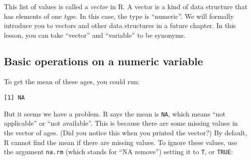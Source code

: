 \documentclass[
  letterpaper,
  DIV=11,
  numbers=noendperiod]{scrreprt}
\newenvironment{Shaded}{\begin{snugshade}}{\end{snugshade}}
\newcommand{\AttributeTok}[1]{\textcolor[rgb]{0.40,0.45,0.13}{#1}}
\newcommand{\FunctionTok}[1]{\textcolor[rgb]{0.28,0.35,0.67}{#1}}
\newcommand{\NormalTok}[1]{\textcolor[rgb]{0.00,0.23,0.31}{#1}}
\newcommand{\SpecialCharTok}[1]{\textcolor[rgb]{0.37,0.37,0.37}{#1}}
\begin{document}
\begin{tcolorbox}[enhanced jigsaw, colframe=quarto-callout-note-color-frame, rightrule=.15mm, opacityback=0, breakable, coltitle=black, colbacktitle=quarto-callout-note-color!10!white, bottomrule=.15mm, leftrule=.75mm, toprule=.15mm, arc=.35mm, bottomtitle=1mm, colback=white, left=2mm, opacitybacktitle=0.6, titlerule=0mm, title=\textcolor{quarto-callout-note-color}{\faInfo}\hspace{0.5em}{Vocab}, toptitle=1mm]

This list of values is called a \emph{vector} in R. A vector is a kind
of data structure that has elements of one \emph{type}. In this case,
the type is ``numeric''. We will formally introduce you to vectors and
other data structures in a future chapter. In this lesson, you can take
``vector'' and ``variable'' to be synonyms.

\end{tcolorbox}

\hypertarget{basic-operations-on-a-numeric-variable}{%
\subsection{Basic operations on a numeric
variable}\label{basic-operations-on-a-numeric-variable}}

To get the mean of these ages, you could run:

\begin{Shaded}
\end{Shaded}

\begin{verbatim}
[1] NA
\end{verbatim}

But it seems we have a problem. R says the mean is \texttt{NA}, which
means ``not applicable'' or ``not available''. This is because there are
some missing values in the vector of ages. (Did you notice this when you
printed the vector?) By default, R cannot find the mean if there are
missing values. To ignore these values, use the argument \texttt{na.rm}
(which stands for ``NA remove'') setting it to \texttt{T}, or
\texttt{TRUE}:

\begin{Shaded}
\end{Shaded}
\end{document}

